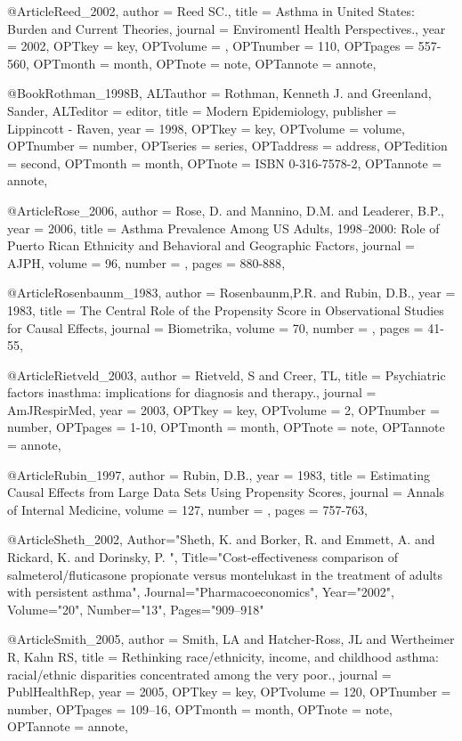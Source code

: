 {{{@Article{Reed_2002,
author = {Reed SC.},
title = {Asthma in United States: Burden and Current Theories},
journal = {Enviromentl Health Perspectives.},
year = {2002},
OPTkey = {key},
OPTvolume = {},
OPTnumber = {110},
OPTpages = {557-560},
OPTmonth = {month},
OPTnote = {note},
OPTannote = {annote},
}


@Book{Rothman_1998B,
ALTauthor = {Rothman, Kenneth J. and Greenland, Sander},
ALTeditor = {editor},
title = {Modern Epidemiology},
publisher = {Lippincott - Raven},
year = {1998},
OPTkey = {key},
OPTvolume = {volume},
OPTnumber = {number},
OPTseries = {series},
OPTaddress = {address},
OPTedition = {second},
OPTmonth = {month},
OPTnote = {{ISBN} 0-316-7578-2},
OPTannote = {annote},
}


@Article{Rose_2006,
  author = {Rose, D. and Mannino, D.M. and Leaderer, B.P.},
  year = {2006},
  title = {Asthma Prevalence Among US Adults, 1998–2000: Role of Puerto Rican Ethnicity and Behavioral and Geographic Factors},
  journal = AJPH,
  volume =  {96},
  number = {},
  pages = {880-888},
}

@Article{Rosenbaunm_1983,
  author = {Rosenbaunm,P.R. and Rubin, D.B.},
  year = {1983},
  title = {The Central Role of the Propensity Score in Observational Studies for Causal Effects},
  journal = {Biometrika},
  volume =  {70},
  number = {},
  pages = {41-55},
}

@Article{Rietveld_2003,
author = {Rietveld, S and Creer, TL},
title = {Psychiatric factors inasthma: implications for diagnosis and therapy.},
journal = {AmJRespirMed},
year = {2003},
OPTkey = {key},
OPTvolume = {2},
OPTnumber = {number},
OPTpages = {1-10},
OPTmonth = {month},
OPTnote = {note},
OPTannote = {annote},
}

@Article{Rubin_1997,
  author = {Rubin, D.B.},
  year = {1983},
  title = {Estimating Causal Effects from Large Data Sets Using Propensity Scores},
  journal = {Annals of Internal Medicine},
  volume =  {127},
  number = {},
  pages = {757-763},
}


@Article{Sheth_2002,
   Author="Sheth, K.  and Borker, R.  and Emmett, A.  and Rickard, K.  and Dorinsky, P. ",
   Title="{{C}ost-effectiveness comparison of salmeterol/fluticasone propionate versus montelukast in the treatment of adults with persistent asthma}",
   Journal="Pharmacoeconomics",
   Year="2002",
   Volume="20",
   Number="13",
   Pages="909--918"
}

@Article{Smith_2005,
author = {Smith, LA and Hatcher-Ross, JL and Wertheimer R, Kahn RS},
title = {Rethinking race/ethnicity, income, and childhood asthma: racial/ethnic disparities concentrated
among the very poor.},
journal = {PublHealthRep},
year = {2005},
OPTkey = {key},
OPTvolume = {120},
OPTnumber = {number},
OPTpages = {109–16},
OPTmonth = {month},
OPTnote = {note},
OPTannote = {annote},
}

}}}
